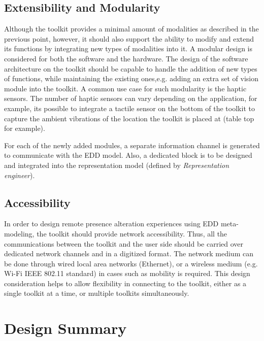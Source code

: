 \subsection{Extensibility and Modularity}
Although the toolkit provides a minimal amount of modalities as described in the previous point, however, it should also support the ability to modify and extend its functions by integrating new types of modalities into it. A modular design is considered for both the software and the hardware. The design of the software architecture on the toolkit should be capable to handle the addition of new types of functions, while maintaining the existing ones,e.g. adding an extra set of vision module into the toolkit. A common use case for such modularity is the haptic sensors. The number of haptic sensors can vary depending on the application, for example, its possible to integrate a tactile sensor on the bottom of the toolkit to capture the ambient vibrations of the location the toolkit is placed at (table top for example). 

For each of the newly added modules, a separate information channel is generated to communicate with the EDD model. Also, a dedicated block is to be designed and integrated into the representation model (defined by \textit{Representation engineer}).

\subsection{Accessibility}

In order to design remote presence alteration experiences using EDD meta-modeling, the toolkit should provide network accessibility. Thus, all the communications between the toolkit and the user side should be carried over dedicated network channels and in a digitized format. The network medium can be done through wired local area networks (Ethernet), or a wireless medium (e.g. Wi-Fi IEEE 802.11 standard) in cases such as mobility is required. This design consideration helps to allow flexibility in connecting to the toolkit, either as a single toolkit at a time, or multiple toolkits simultaneously. 

\section{Design Summary}

